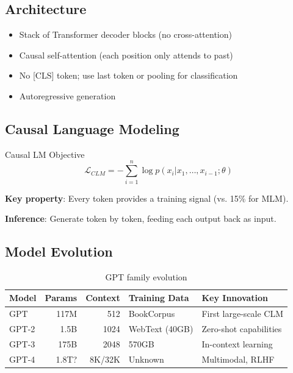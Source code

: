 \subsection{Architecture}

\begin{itemize}
    \item Stack of Transformer decoder blocks (no cross-attention)
    \item Causal self-attention (each position only attends to past)
    \item No [CLS] token; use last token or pooling for classification
    \item Autoregressive generation
\end{itemize}

\subsection{Causal Language Modeling}

\begin{mathresult}{Causal LM Objective}
\begin{equation}
\mathcal{L}_{CLM} = -\sum_{i=1}^{n} \log p(x_i | x_1, \ldots, x_{i-1}; \theta)
\end{equation}
\end{mathresult}

\textbf{Key property}: Every token provides a training signal (vs. 15\% for MLM).

\textbf{Inference}: Generate token by token, feeding each output back as input.

\subsection{Model Evolution}

\begin{table}[H]
\centering
\caption{GPT family evolution}
\begin{tabularx}{\textwidth}{lrrlX}
\toprule
\textbf{Model} & \textbf{Params} & \textbf{Context} & \textbf{Training Data} & \textbf{Key Innovation} \\
\midrule
GPT & 117M & 512 & BookCorpus & First large-scale CLM \\
GPT-2 & 1.5B & 1024 & WebText (40GB) & Zero-shot capabilities \\
GPT-3 & 175B & 2048 & 570GB & In-context learning \\
GPT-4 & ~1.8T? & 8K/32K & Unknown & Multimodal, RLHF \\
\bottomrule
\end{tabularx}
\end{table}

